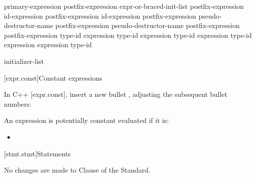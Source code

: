 \begin{std.txt}
\begin{bnf}
\br
    primary-expression\br
    postfix-expression \terminal{[} expr-or-braced-init-list \terminal{]}\br
    \br
    \br
    \br
    \br
    \br
    \br
    \br
    postfix-expression  id-expression\br
    postfix-expression  id-expression\br
    postfix-expression  pseudo-destructor-name\br
    postfix-expression \terminal{->} pseudo-destructor-name\br
    postfix-expression \terminal{++}\br
    postfix-expression \terminal{-{-}}\br
     type-id \terminal{> (} expression \terminal{)}\br
     type-id \terminal{> (} expression \terminal{)}\br
     type-id \terminal{> (} expression \terminal{)}\br
     type-id \terminal{> (} expression \terminal{)}\br
     expression \terminal{)}\br
     type-id \terminal{)}
\end{bnf}
\begin{bnf}
\br
    \br
\end{bnf}
\begin{bnf}
\br
    \br
    \br
    \br
    \br
\end{bnf}
\begin{bnf}
\br
    initializer-list\br
\end{bnf}
\end{std.txt}

[expr.const]{Constant expressions}

In C++ [expr.const], insert a new bullet , adjusting the subsequent bullet numbers:

\setcounter{Paras}{7}
\setcounter{Bullets1}{4}

\begin{std.txt}
\pnum
An expression is potentially constant evaluated if it is: \newline
[...]
\begin{itemize}
\setcounter{Bullets1}{4}
  \item {}
\end{itemize}
\end{std.txt}

[stmt.stmt]{Statements}

No changes are made to Clause \the\value{chapter} of the \Cpp Standard.
